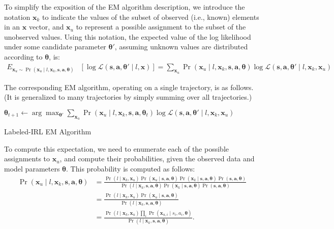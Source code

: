 To simplify the exposition of the EM algorithm description, we
introduce the notation $\bm{x}_k$ to indicate the values of the subset
of observed (i.e., known) elements in an $\bm{x}$ vector, and
$\bm{x}_u$ to represent a possible assignment to the subset of the
unobserved values.  Using this notation, the expected value of the log
likelihood under some candidate parameter $\bm{\theta}'$, assuming
unknown values are distributed according to $\bm{\theta}$, is:
%
\begin{align*}
E_{\bm{x}_u \sim \Pr(\bm{x}_u \mid l, \bm{x}_k, \bm{s}, \bm{a}, \bm{\theta})} & \left[ \log\mathcal{L}(\bm{s}, \bm{a}, \bm{\theta}' \mid l, \bm{x}) \right]
= \sum_{\bm{x}_u} \Pr(\bm{x}_u \mid l, \bm{x}_k, \bm{s}, \bm{a}, \bm{\theta}) \log\mathcal{L}(\bm{s}, \bm{a}, \bm{\theta}' \mid l, \bm{x}_k, \bm{x}_u)
\end{align*}

\noindent
The corresponding EM algorithm, operating on a single trajectory, is
as follows. (It is generalized to many trajectories by simply summing
over all trajectories.)

\begin{algorithm}
\begin{algorithmic}
\State $\bm{\theta}_{t+1} \gets \arg \max_{\bm{\theta'}} \sum_{\bm{x}_u} \Pr(\bm{x}_u \mid l, \bm{x}_k, \bm{s}, \bm{a}, \bm{\theta}_t) \log\mathcal{L}(\bm{s}, \bm{a}, \bm{\theta'} \mid l, \bm{x}_k, \bm{x}_u)$
\EndFor
\end{algorithmic}
\caption{Labeled-IRL EM Algorithm}
\end{algorithm}

To compute this expectation, we need to enumerate each of the
possible assignments to $\bm{x}_u$, and compute their probabilities,
given the observed data and model parameters $\bm{\theta}$.  This
probability is computed as follows:
%
\begin{align*}
\Pr(\bm{x}_u \mid l, \bm{x}_k, \bm{s}, \bm{a}, \bm{\theta}) &= \frac{\Pr(l \mid \bm{x}_k, \bm{x}_u) \Pr(\bm{x}_u \mid \bm{s}, \bm{a}, \bm{\theta}) \Pr(\bm{x}_k \mid \bm{s}, \bm{a}, \bm{\theta}) \Pr(\bm{s}, \bm{a}, \bm{\theta})}{\Pr(l \mid \bm{x}_k, \bm{s}, \bm{a}, \bm{\theta}) \Pr(\bm{x}_k \mid \bm{s}, \bm{a}, \bm{\theta}) \Pr(\bm{s}, \bm{a}, \bm{\theta})} \\
 &= \frac{\Pr(l \mid \bm{x}_k, \bm{x}_u) \Pr(\bm{x}_u \mid \bm{s}, \bm{a}, \bm{\theta}) }{\Pr(l \mid \bm{x}_k, \bm{s}, \bm{a}, \bm{\theta})} \\
 &= \frac{\Pr(l \mid \bm{x}_k, \bm{x}_u) \prod_i \Pr(\bm{x}_{u,i} \mid s_i, a_i, \bm{\theta}) }{\Pr(l \mid \bm{x}_k, \bm{s}, \bm{a}, \bm{\theta})}. 
\end{align*}

